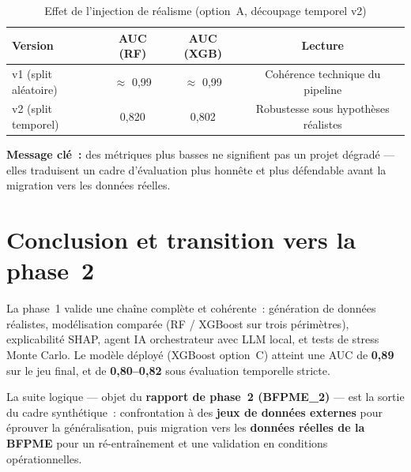 \documentclass[a4paper,11pt]{article}
\begin{document}
\begin{table}[H]
\centering
\caption{Effet de l'injection de réalisme (option~A, découpage temporel v2)}
\label{tab:realisme}
\renewcommand{\arraystretch}{1.3}
\begin{tabularx}{\textwidth}{@{}l C C C@{}}
\toprule
\textbf{Version} & \textbf{AUC (RF)} & \textbf{AUC (XGB)} & \textbf{Lecture} \\
\midrule
v1 (split aléatoire)  & $\approx$ 0{,}99 & $\approx$ 0{,}99 & Cohérence technique du pipeline \\
v2 (split temporel)   & 0{,}820 & 0{,}802 & Robustesse sous hypothèses réalistes \\
\bottomrule
\end{tabularx}
\end{table}

\noindent\textbf{Message clé~:} des métriques plus basses ne signifient pas un projet dégradé —
elles traduisent un cadre d'évaluation plus honnête et plus défendable avant la migration vers
les données réelles.

\section{Conclusion et transition vers la phase~2}

La phase~1 valide une chaîne complète et cohérente~: génération de données réalistes,
modélisation comparée (RF / XGBoost sur trois périmètres), explicabilité SHAP, agent IA
orchestrateur avec LLM local, et tests de stress Monte Carlo. Le modèle déployé (XGBoost
option~C) atteint une AUC de \textbf{0{,}89} sur le jeu final, et de \textbf{0{,}80–0{,}82} sous
évaluation temporelle stricte.

La suite logique — objet du \textbf{rapport de phase~2 (BFPME\_2)} — est la sortie du cadre
synthétique~: confrontation à des \textbf{jeux de données externes} pour éprouver la
généralisation, puis migration vers les \textbf{données réelles de la BFPME} pour un
ré-entraînement et une validation en conditions opérationnelles.
\end{document}
